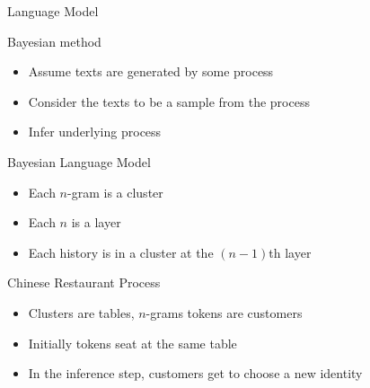 \begin{frame}{Language Model}
    \begin{block}{Bayesian method}
        \begin{itemize}
            \item Assume texts are generated by some process
            \item Consider the texts to be a sample from the process
            \item Infer underlying process
        \end{itemize}
    \end{block}

    \begin{block}{Bayesian Language Model}
        \begin{itemize}
            \item Each $n$-gram is a cluster
            \item Each $n$ is a layer
            \item Each history is in a cluster at the $(n-1)$th layer
        \end{itemize}
    \end{block}

    \begin{block}{Chinese Restaurant Process}
        \begin{itemize}
            \item Clusters are tables, $n$-grams tokens are customers
            \item Initially tokens seat at the same table
            \item In the inference step, customers get to choose a new identity
        \end{itemize}
    \end{block}
\end{frame}
\note[itemize]{
}

